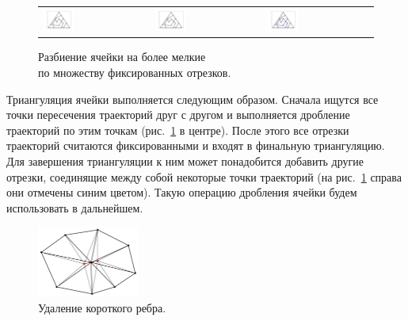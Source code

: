 \begin{figure}[ht]
\centering
\begin{tabular}{lll}
\includegraphics[width=0.3\textwidth]{fig/int_split_triangle_1_small.png}
&
\includegraphics[width=0.3\textwidth]{fig/int_split_triangle_2_small.png}
&
\includegraphics[width=0.3\textwidth]{fig/int_split_triangle_3_small.png}
\end{tabular}
\singlespacing
{}\caption{Разбиение ячейки на более мелкие \\ по множеству фиксированных отрезков.}
\label{fig:int_cell_cut_by_segements}
\end{figure}

Триангуляция ячейки выполняется следующим образом.
Сначала ищутся все точки пересечения траекторий друг с другом и выполняется дробление траекторий по этим точкам (рис.~\ref{fig:int_cell_cut_by_segements} в центре).
После этого все отрезки траекторий считаются фиксированными и входят в финальную триангуляцию.
Для завершения триангуляции к ним может понадобится добавить другие отрезки, соединящие между собой некоторые точки траекторий (на рис.~\ref{fig:int_cell_cut_by_segements} справа они отмечены синим цветом).
Такую операцию дробления ячейки будем использовать в дальнейшем.

\begin{figure}[ht]
\centering
\includegraphics[width=0.3\textwidth]{fig/int_reduce_edge.pdf}
\singlespacing
{}\caption{Удаление короткого ребра.}\label{fig:text_1_int_reduce_edge}
\end{figure}

